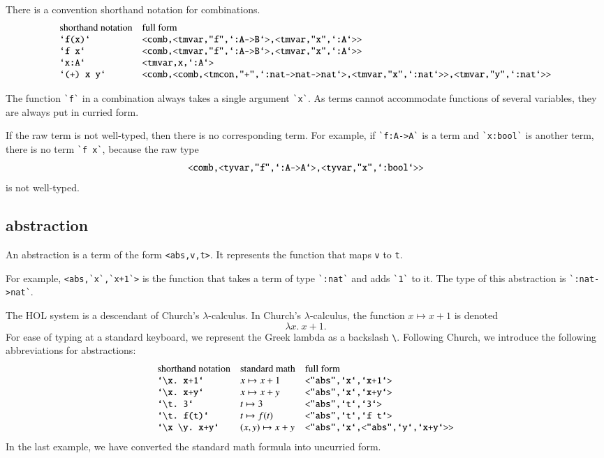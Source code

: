 There is a convention shorthand notation for combinations.
$$
\begin{array}{lll}
\hbox{shorthand notation}&\hbox{full form}\\
\verb!`f(x)`! & \verb!<comb,<tmvar,"f",`:A->B`>,<tmvar,"x",`:A`>>!\\
\verb!`f x`! & \verb!<comb,<tmvar,"f",`:A->B`>,<tmvar,"x",`:A`>>!\\
\verb!`x:A`!&\verb!<tmvar,x,`:A`>!\\
\verb!`(+) x y`! & \verb!<comb,<comb,<tmcon,"+",`:nat->nat->nat`>,<tmvar,"x",`:nat`>>,<tmvar,"y",`:nat`>>!\\
\end{array}
$$

The function \verb!`f`! in a combination always takes a single argument \verb!`x`!.  As terms cannot accommodate functions of several variables, they are always put in curried form.

If the raw term is not well-typed, then there is no corresponding term.  For example, if \verb!`f:A->A`! is a term and
\verb!`x:bool`! is another term, there is no term \verb!`f x`!, because the raw type
$$
\verb!<comb,<tyvar,"f",`:A->A`>,<tyvar,"x",`:bool`>>!
$$
is not well-typed.

\subsection{abstraction}

An abstraction is a term of the form \verb!<abs,v,t>!.  It
represents the function that maps \verb!v! to \verb!t!.

For example, \verb!<abs,`x`,`x+1`>! is the function that
takes a term of type \verb!`:nat`! and adds \verb!`1`! to
it.  The type of this abstraction is \verb!`:nat->nat`!.

The HOL system is a descendant of Church's $\lambda$-calculus.
In Church's $\lambda$-calculus, the function $x\mapsto x+1$
is denoted
$$
\lambda x.~x+1.
$$
For ease of typing at a standard keyboard, we represent the Greek lambda as a backslash \verb!\!.
Following Church, we introduce the following abbreviations
for abstractions:
$$
\begin{array}{lll}
\hbox{shorthand notation}&\hbox{standard math}&\hbox{full form}\\
\verb!`\x. x+1`!&x\mapsto x+1&\verb!<"abs",`x`,`x+1`>!\\
\verb!`\x. x+y`!&x\mapsto x+y&\verb!<"abs",`x`,`x+y`>!\\
\verb!`\t. 3`!&t\mapsto 3&\verb!<"abs",`t`,`3`>!\\
\verb!`\t. f(t)`!&t\mapsto f(t)&\verb!<"abs",`t`,`f t`>!\\
\verb!`\x \y. x+y`!&(x,y)\mapsto x+y&\verb!<"abs",`x`,<"abs",`y`,`x+y`>>!\\
\end{array}
$$
In the last example, we have converted the standard math formula into uncurried form.

